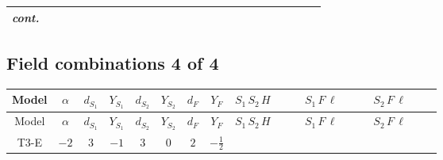 \documentclass[8pt]{article}
\begin{document}
\begin{landscape}
\begin{longtable}{@{}cccccccc >{\raggedright\arraybackslash}p{0.21\linewidth} >{\raggedright\arraybackslash}p{0.21\linewidth} >{\raggedright\arraybackslash}p{0.21\linewidth}@{}}
\textit{cont.} &  &  &  &  &  &  &  & \scriptsize\adjustbox{max width=\linewidth}{$\begin{gathered} +\frac{1}{2} H_{a_2} S_{1,j_2} H_{a_1}{}^{\dagger } S_{1,j_1}{}^{\dagger } \mathcal{I}_{H1,a_1,a_2,j_2,j_1}{}^2 \lambda_{HS_1}^{(1)}^{(2)}\end{gathered}$} &  & \scriptsize\adjustbox{max width=\linewidth}{$\begin{gathered} +\frac{1}{2} H_{a_2} S_{2,j_2} H_{a_1}{}^{\dagger } S_{2,j_1}{}^{\dagger } \mathcal{I}_{H2,a_1,a_2,j_2,j_1}{}^2 \lambda_{HS_2}^{(1)}^{(2)}\end{gathered}$} \\
\midrule
\bottomrule
\end{longtable}
\clearpage
\subsection*{Field combinations 4 of 4}
\begin{longtable}{@{}cccccccc >{\raggedright\arraybackslash}p{0.21\linewidth} >{\raggedright\arraybackslash}p{0.21\linewidth} >{\raggedright\arraybackslash}p{0.21\linewidth}@{}}
\toprule
Model & $\alpha$ & $d_{S_1}$ & $Y_{S_1}$ & $d_{S_2}$ & $Y_{S_2}$ & $d_F$ & $Y_F$ & $S_1\,S_2\,H$ & $S_1\,F\,\ell$ & $S_2\,F\,\ell$ \\
\midrule
\endfirsthead
\toprule
Model & $\alpha$ & $d_{S_1}$ & $Y_{S_1}$ & $d_{S_2}$ & $Y_{S_2}$ & $d_F$ & $Y_F$ & $S_1\,S_2\,H$ & $S_1\,F\,\ell$ & $S_2\,F\,\ell$ \\
\midrule
\endhead
T3-E & $-2$ & $3$ & $-1$ & $3$ & $0$ & $2$ & $-\frac{1}{2}$ & \scriptsize\adjustbox{max width=\linewidth}{$\begin{gathered} +\overline{\lambda_5} S_{2,j_2} {\mathcal{I}_{LLS_1S_2}}^{*}_{a_1,a_2,j_1,j_2} H_{a_1}{}^{\dagger } H_{a_2}{}^{\dagger } S_{1,j_1}{}^{\dagger } \\ +H_{a_1} H_{a_2} S_{1,j_2} \mathcal{I}_{T3,a_1,a_2,j_2,j_1} \lambda_5 S_{2,j_1}{}^{\dagger }\end{gathered}$} & \scriptsize\adjustbox{max width=\linewidth}{$\begin{gathered} +\overline{L_{a_1,i_1}}\, C\, P_R\, \overline{F_{j_1,r_1}}{}^T S_{1,j_1} y_{1,i_1,r_1} \mathcal{I}_{y_1,a_1,j_1,j_1} \\ +\overline{y_{1,i_1,r_1}} L_{a_1,i_1}{}^T\, C\, P_L\, F_{j_1,r_1} {\mathcal{C}_{LS_1F}}^{*}_{a_1,j_1,j_1} S_{1,j_1}{}^{\dagger }\end{gathered}$} & \scriptsize\adjustbox{max width=\linewidth}{$\begin{gathered} +\overline{y_{2,i_1,r_1}} \overline{F_{j_1,r_1}}\, P_L\, L_{a_1,i_1} S_{2,j_1} {\mathcal{C}_{LS_2F}}^{*}_{a_1,j_1,j_1} \\ +\overline{L_{a_1,i_1}}\, P_R\, F_{j_1,r_1} y_{2,i_1,r_1} \mathcal{I}_{y_2,a_1,j_1,j_1} S_{2,j_1}{}^{\dagger }\end{gathered}$} \\
\midrule
\bottomrule
\end{longtable}
\end{landscape}
\end{document}
